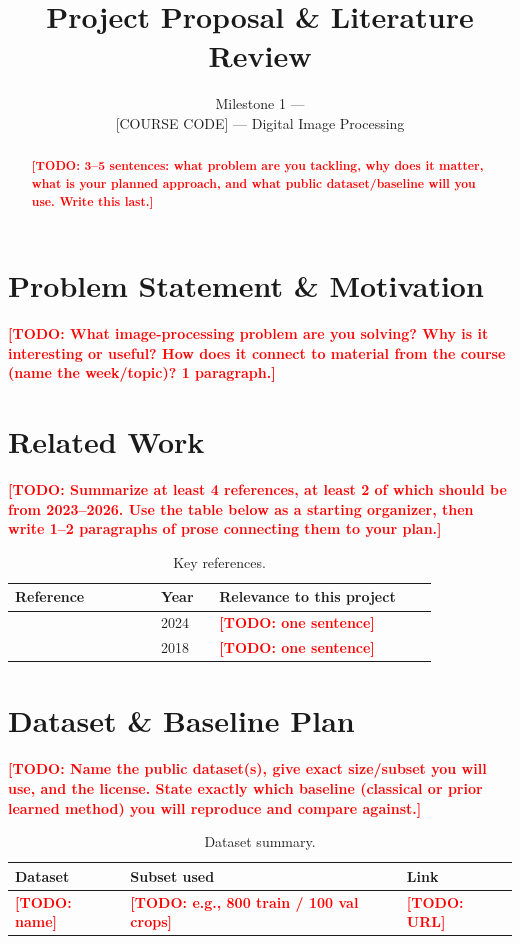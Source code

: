 \documentclass[11pt]{article}
\title{\LARGE Project Proposal \& Literature Review \\[4pt]
\large \todo{Project Title}}
\author{
  \todo{Student A Full Name} \and
  \todo{Student B Full Name} \and
  \todo{Student C Full Name}
}
\date{Milestone 1 --- \todo{Date} \\{} [COURSE CODE] --- Digital Image Processing}
\newcommand{\todo}[1]{\textcolor{red}{\textbf{[TODO: #1]}}}
\begin{document}
\maketitle

\begin{abstract}
\todo{3--5 sentences: what problem are you tackling, why does it matter, what is your
planned approach, and what public dataset/baseline will you use. Write this last.}
\end{abstract}

\section{Problem Statement \& Motivation}
\label{sec:motivation}
\todo{What image-processing problem are you solving? Why is it interesting or useful?
How does it connect to material from the course (name the week/topic)? 1 paragraph.}

\section{Related Work}
\label{sec:related}
\todo{Summarize at least 4 references, at least 2 of which should be from 2023--2026.
Use the table below as a starting organizer, then write 1--2 paragraphs of prose
connecting them to your plan.}

\begin{table}[h]
\centering
\caption{Key references.}
\label{tab:refs}
\begin{tabular}{@{}p{0.30\linewidth}p{0.12\linewidth}p{0.45\linewidth}@{}}
\toprule
\textbf{Reference} & \textbf{Year} & \textbf{Relevance to this project} \\
\midrule
\citep{example2024} & 2024 & \todo{one sentence} \\
\citep{example2018}  & 2018 & \todo{one sentence} \\
\bottomrule
\end{tabular}
\end{table}

\section{Dataset \& Baseline Plan}
\label{sec:data}
\todo{Name the public dataset(s), give exact size/subset you will use, and the license.
State exactly which baseline (classical or prior learned method) you will reproduce
and compare against.}

\begin{table}[h]
\centering
\caption{Dataset summary.}
\label{tab:data}
\begin{tabular}{@{}lll@{}}
\toprule
\textbf{Dataset} & \textbf{Subset used} & \textbf{Link} \\
\midrule
\todo{name} & \todo{e.g., 800 train / 100 val crops} & \todo{URL} \\
\bottomrule
\end{tabular}
\end{table}
\end{document}
